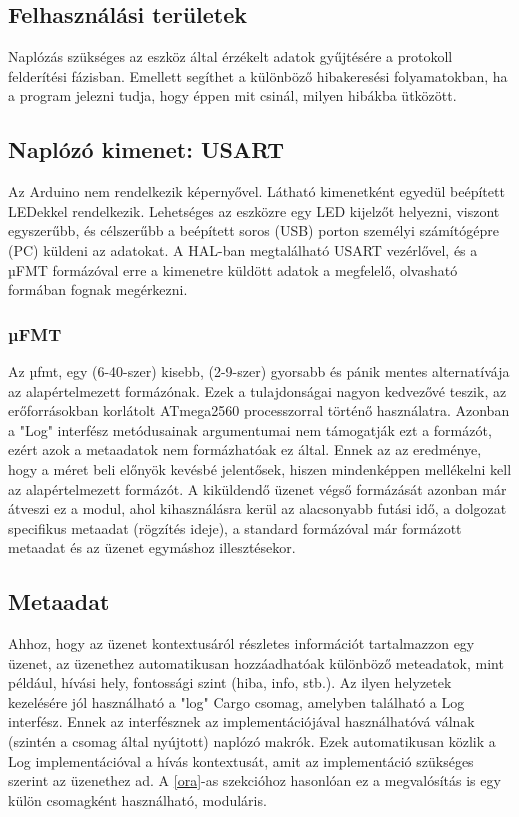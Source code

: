 \label{sec:naplozas}
\subsection{Felhasználási területek}
Naplózás szükséges az eszköz által érzékelt adatok gyűjtésére a protokoll felderítési fázisban.
Emellett segíthet a különböző hibakeresési folyamatokban, ha a program jelezni tudja, hogy éppen mit csinál, milyen hibákba ütközött.

\subsection{Naplózó kimenet: USART}
Az Arduino nem rendelkezik képernyővel. Látható kimenetként egyedül beépített LEDekkel rendelkezik.
Lehetséges az eszközre egy LED kijelzőt helyezni, viszont egyszerűbb, és célszerűbb a beépített soros (USB) porton személyi számítógépre (PC) küldeni az adatokat.
A HAL-ban megtalálható USART vezérlővel, és a µFMT formázóval erre a kimenetre küldött adatok a megfelelő, olvasható formában fognak megérkezni.

\subsubsection{µFMT}
Az µfmt, egy (6-40-szer) kisebb, (2-9-szer) gyorsabb és pánik mentes alternatívája az alapértelmezett formázónak.\cite{ufmt_rust}
Ezek a tulajdonságai nagyon kedvezővé teszik, az erőforrásokban korlátolt ATmega2560 processzorral történő használatra.
Azonban a "Log" interfész metódusainak argumentumai nem támogatják ezt a formázót, ezért azok a metaadatok nem formázhatóak ez által.
Ennek az az eredménye, hogy a méret beli előnyök kevésbé jelentősek, hiszen mindenképpen mellékelni kell az alapértelmezett formázót.
A kiküldendő üzenet végső formázását azonban már átveszi ez a modul, ahol kihasználásra kerül az alacsonyabb futási idő, a dolgozat specifikus metaadat (rögzítés ideje), a standard formázóval már formázott metaadat és az üzenet egymáshoz illesztésekor.

\subsection{Metaadat}
Ahhoz, hogy az üzenet kontextusáról részletes információt tartalmazzon egy üzenet, az üzenethez automatikusan hozzáadhatóak különböző meteadatok, mint például, hívási hely, fontossági szint (hiba, info, stb.).
Az ilyen helyzetek kezelésére jól használható a "log" Cargo csomag, amelyben található a Log interfész. 
Ennek az interfésznek az implementációjával használhatóvá válnak (szintén a csomag által nyújtott) naplózó makrók.
Ezek automatikusan közlik a Log implementációval a hívás kontextusát, amit az implementáció szükséges szerint az üzenethez ad.
A \ref{ora}-as szekcióhoz hasonlóan ez a megvalósítás is egy külön csomagként használható, moduláris.


